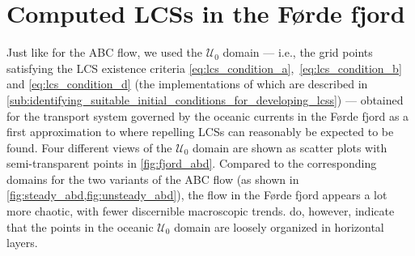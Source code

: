 \section{Computed LCSs in the Førde fjord}
\label{sec:computed_lcss_in_the_forde_fjord}

Just like for the ABC flow, we used the $\mathcal{U}_{0}$ domain --- i.e.,
the grid points satisfying the LCS existence criteria
\eqref{eq:lcs_condition_a},~\eqref{eq:lcs_condition_b} and
\eqref{eq:lcs_condition_d} (the implementations of which are described in
\cref{sub:identifying_suitable_initial_conditions_for_developing_lcss}) ---
obtained for the transport system governed by the oceanic currents in the
Førde fjord as a first approximation to where repelling LCSs can reasonably
be expected to be found. Four different views of the $\mathcal{U}_{0}$ domain
are shown as scatter plots with semi-transparent points in
\cref{fig:fjord_abd}. Compared to the corresponding domains for the two
variants  of the ABC flow (as shown in \cref{fig:steady_abd,fig:unsteady_abd}),
the flow in the Førde fjord appears a lot more chaotic, with fewer discernible
macroscopic trends.  do, however,
indicate that the points in the oceanic $\mathcal{U}_{0}$ domain are loosely
organized in horizontal layers.



